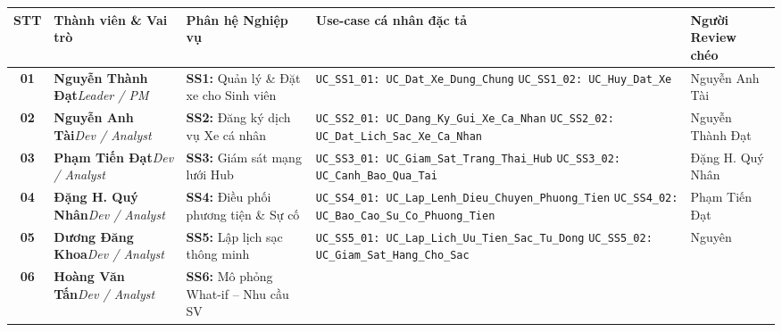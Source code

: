 \documentclass[11pt,a4paper]{article}
\begin{document}
\renewcommand{\arraystretch}{1.35}
{\footnotesize
\begin{tabularx}{\textwidth}{|c|>{\raggedright\arraybackslash}p{2.6cm}|>{\raggedright\arraybackslash}p{3.2cm}|>{\raggedright\arraybackslash}X|>{\raggedright\arraybackslash}p{2.4cm}|}
  \hline
  \rowcolor{lightgray} \textbf{STT} & \textbf{Thành viên \& Vai trò} & \textbf{Phân hệ Nghiệp vụ} & \textbf{Use-case cá nhân đặc tả} & \textbf{Người Review chéo} \\
  \hline
  \textbf{01} &
  \textbf{Nguyễn Thành Đạt}\newline\textit{Leader / PM} &
  \textbf{SS1:} Quản lý \& Đặt xe cho Sinh viên &
  \texttt{UC\_SS1\_01: UC\_Dat\_Xe\_Dung\_Chung}\newline
  \texttt{UC\_SS1\_02: UC\_Huy\_Dat\_Xe} &
  Nguyễn Anh Tài \\
  \hline
  \textbf{02} &
  \textbf{Nguyễn Anh Tài}\newline\textit{Dev / Analyst} &
  \textbf{SS2:} Đăng ký dịch vụ Xe cá nhân &
  \texttt{UC\_SS2\_01: UC\_Dang\_Ky\_Gui\_Xe\_Ca\_Nhan}\newline
  \texttt{UC\_SS2\_02: UC\_Dat\_Lich\_Sac\_Xe\_Ca\_Nhan} &
  Nguyễn Thành Đạt \\
  \hline
  \textbf{03} &
  \textbf{Phạm Tiến Đạt}\newline\textit{Dev / Analyst} &
  \textbf{SS3:} Giám sát mạng lưới Hub &
  \texttt{UC\_SS3\_01: UC\_Giam\_Sat\_Trang\_Thai\_Hub}\newline
  \texttt{UC\_SS3\_02: UC\_Canh\_Bao\_Qua\_Tai} &
  Đặng H. Quý Nhân \\
  \hline
  \textbf{04} &
  \textbf{Đặng H. Quý Nhân}\newline\textit{Dev / Analyst} &
  \textbf{SS4:} Điều phối phương tiện \& Sự cố &
  \texttt{UC\_SS4\_01: UC\_Lap\_Lenh\_Dieu\_Chuyen\_\allowbreak Phuong\_Tien}\newline
  \texttt{UC\_SS4\_02: UC\_Bao\_Cao\_Su\_Co\_\allowbreak Phuong\_Tien} &
  Phạm Tiến Đạt \\
  \hline
  \textbf{05} &
  \textbf{Dương Đăng Khoa}\newline\textit{Dev / Analyst} &
  \textbf{SS5:} Lập lịch sạc thông minh &
  \texttt{UC\_SS5\_01: UC\_Lap\_Lich\_Uu\_Tien\_\allowbreak Sac\_Tu\_Dong}\newline
  \texttt{UC\_SS5\_02: UC\_Giam\_Sat\_Hang\_Cho\_Sac} &
  Nguyên \\
  \hline
  \textbf{06} &
  \textbf{Hoàng Văn Tấn}\newline\textit{Dev / Analyst} &
  \textbf{SS6:} Mô phỏng What-if -- Nhu cầu SV &

\end{tabularx}}
\end{document}
